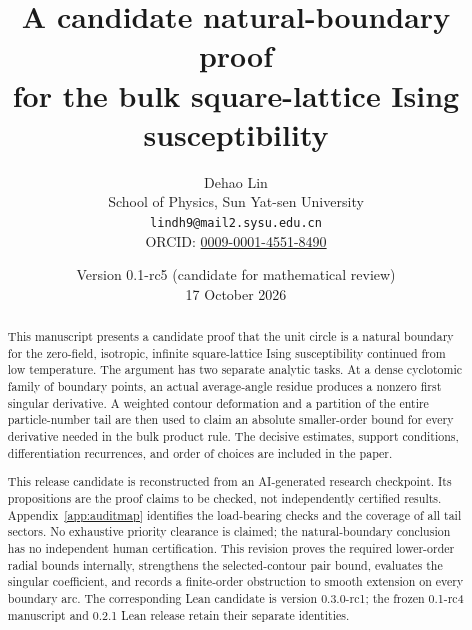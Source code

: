 \documentclass[11pt]{article}
\title{A candidate natural-boundary proof\\
for the bulk square-lattice Ising susceptibility}
\author{Dehao Lin\\
\small School of Physics, Sun Yat-sen University\\
\small\texttt{lindh9@mail2.sysu.edu.cn}\\
\small ORCID: \href{https://orcid.org/0009-0001-4551-8490}{0009-0001-4551-8490}}
\date{Version 0.1-rc5 (candidate for mathematical review)\\17 October 2026}
\numberwithin{equation}{section}
\theoremstyle{definition}
\begin{document}
\maketitle

\begin{abstract}
This manuscript presents a candidate proof that the unit circle is a
natural boundary for the zero-field, isotropic, infinite square-lattice
Ising susceptibility continued from low temperature. The argument has
two separate analytic tasks. At a dense cyclotomic family of boundary
points, an actual average-angle residue produces a nonzero first
singular derivative. A weighted contour deformation and a partition of
the entire particle-number tail are then used to claim an absolute
smaller-order bound for every derivative needed in the bulk product
rule. The decisive estimates, support conditions, differentiation
recurrences, and order of choices are included in the paper.

This release candidate is reconstructed from an AI-generated research checkpoint.
Its propositions are the proof claims to be checked, not independently
certified results. Appendix~\ref{app:auditmap} identifies the load-bearing
checks and the coverage of all tail sectors. No exhaustive priority
clearance is claimed; the natural-boundary conclusion has no
independent human certification. This revision proves the required
lower-order radial bounds internally, strengthens the selected-contour
pair bound, evaluates the singular coefficient, and records a finite-order
obstruction to smooth extension on every boundary arc. The corresponding
Lean candidate is version 0.3.0-rc1; the frozen 0.1-rc4 manuscript and
0.2.1 Lean release retain their separate identities.
\end{abstract}
\end{document}
